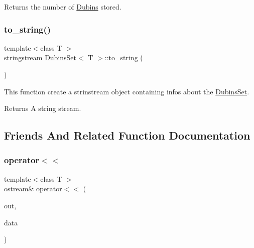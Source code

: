 Returns the number of {\ttfamily \mbox{\hyperlink{class_dubins}{Dubins}}} stored. 

\mbox{\label{class_dubins_set_acfedfbe0ef1ff445cbaff93c70205f86}} 
\subsubsection{\texorpdfstring{to\_string()}{to\_string()}}
{\footnotesize\ttfamily template$<$class T $>$ \\
stringstream \mbox{\hyperlink{class_dubins_set}{Dubins\+Set}}$<$ T $>$\+::to\+\_\+string (\begin{DoxyParamCaption}{ }\end{DoxyParamCaption})\hspace{0.3cm}{\ttfamily [inline]}}

This function create a strinstream object containing infos about the {\ttfamily \mbox{\hyperlink{class_dubins_set}{Dubins\+Set}}}. \begin{DoxyReturn}{Returns}
A string stream. 
\end{DoxyReturn}


\subsection{Friends And Related Function Documentation}
\mbox{\label{class_dubins_set_af51d3dfa97a9eb56e9c5d066ed044f4a}} 
\subsubsection{\texorpdfstring{operator$<$$<$}{operator<<}}
{\footnotesize\ttfamily template$<$class T $>$ \\
ostream\& operator$<$$<$ (\begin{DoxyParamCaption}\item[{ostream \&}]{out,  }\item[{\mbox{\hyperlink{class_dubins_set}{Dubins\+Set}}$<$ T $>$ \&}]{data }\end{DoxyParamCaption})\hspace{0.3cm}{\ttfamily [friend]}}

